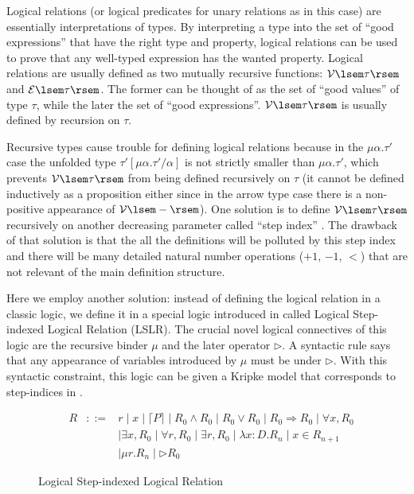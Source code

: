\documentclass[preprint]{sigplanconf}
\newcommand{\relV}[1]{\mathcal{V}\lsem#1\rsem}
\newcommand{\relE}[1]{\mathcal{E}\lsem#1\rsem}
\newcommand{\later}{\triangleright}
\begin{document}
Logical relations (or logical predicates for unary relations as in this case) are essentially interpretations of types. By interpreting a type into the set of ``good expressions'' that have the right type and property, logical relations can be used to prove that any well-typed expression has the wanted property. Logical relations are usually defined as two mutually recursive functions: $\relV{\tau}$ and $\relE{\tau}$. The former can be thought of as the set of ``good values'' of type $\tau$, while the later the set of ``good expressions''. $\relV{\tau}$ is usually defined by recursion on $\tau$.

Recursive types cause trouble for defining logical relations because in the $\mu\alpha.\tau'$ case the unfolded type $\tau'[\mu\alpha.\tau'/\alpha]$ is not strictly smaller than $\mu\alpha.\tau'$, which prevents $\relV{\tau}$ from being defined recursively on $\tau$ (it cannot be defined inductively as a proposition either since in the arrow type case there is a non-positive appearance of $\relV{-}$). One solution is to define $\relV{\tau}$ recursively on another decreasing parameter called ``step index'' \cite{ahmed2006step}. The drawback of that solution is that the all the definitions will be polluted by this step index and there will be many detailed natural number operations ($+1$, $-1$, $<$) that are not relevant of the main definition structure. 

Here we employ another solution: instead of defining the logical relation in a classic logic, we define it in a special logic introduced in \cite{dreyer2009logical} called Logical Step-indexed Logical Relation (LSLR). The crucial novel logical connectives of this logic are the recursive binder $\mu$ and the later operator $\later$. A syntactic rule says that any appearance of variables introduced by $\mu$ must be under $\later$. With this syntactic constraint, this logic can be given a Kripke model that corresponds to step-indices in \cite{ahmed2006step}. 

\begin{figure}
  $$\begin{array}{rrcl}
    & R &::=& r \mid x \mid \lceil P \rceil \mid R_0 \wedge R_0 \mid R_0 \vee R_0 \mid R_0 \Rightarrow R_0 \mid \forall x,R_0 \\ 
    & & & \mid \exists x,R_0 \mid \forall r,R_0 \mid \exists r,R_0 \mid \lambda x:D.R_n \mid x\in R_{n+1} \\
    & & & \mid \mu r. R_n \mid \later R_0
  \end{array}$$
  \caption{\label{lslr}Logical Step-indexed Logical Relation}
\end{figure}
\end{document}
